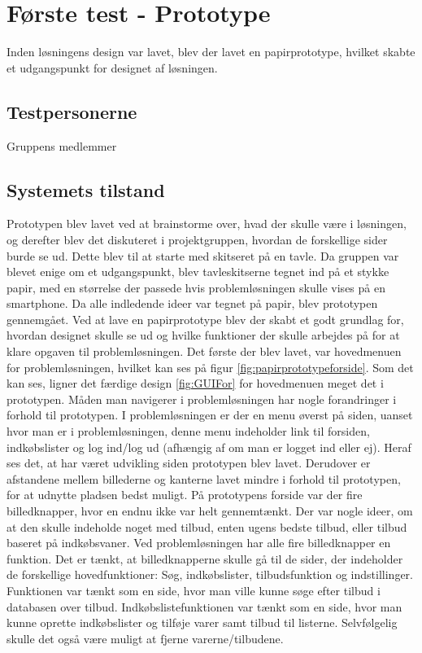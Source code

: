 \section{Første test - Prototype}
Inden løsningens design var lavet, blev der lavet en papirprototype, hvilket skabte et udgangspunkt for designet af løsningen.


\subsection{Testpersonerne}
Gruppens medlemmer

\subsection{Systemets tilstand}
Prototypen blev lavet ved at brainstorme over, hvad der skulle være i løsningen, og derefter blev det diskuteret i projektgruppen, hvordan de forskellige sider burde se ud. Dette blev til at starte med skitseret på en tavle. Da gruppen var blevet enige om et udgangspunkt, blev tavleskitserne tegnet ind på et stykke papir, med en størrelse der passede hvis problemløsningen skulle vises på en smartphone. Da alle indledende ideer var tegnet på papir, blev prototypen gennemgået. Ved at lave en papirprototype blev der skabt et godt grundlag for, hvordan designet skulle se ud og hvilke funktioner der skulle arbejdes på for at klare opgaven til problemløsningen.
Det første der blev lavet, var hovedmenuen for problemløsningen, hvilket kan ses på figur \ref{fig:papirprototypeforside}. Som det kan ses, ligner det færdige design \ref{fig:GUIFor} for hovedmenuen meget det i prototypen. Måden man navigerer i problemløsningen har nogle forandringer i forhold til prototypen. I problemløsningen er der en menu øverst på siden, uanset hvor man er i problemløsningen, denne menu indeholder link til forsiden, indkøbslister og log ind/log ud (afhængig af om man er logget ind eller ej). Heraf ses det, at har været udvikling siden prototypen blev lavet. Derudover er afstandene mellem billederne og kanterne lavet mindre i forhold til prototypen, for at udnytte pladsen bedst muligt.
På prototypens forside var der fire billedknapper, hvor en endnu ikke var helt gennemtænkt. Der var nogle ideer, om at den skulle indeholde noget med tilbud, enten ugens bedste tilbud, eller tilbud baseret på indkøbsvaner. Ved problemløsningen har alle fire billedknapper en funktion. Det er tænkt, at billedknapperne skulle gå til de sider, der indeholder de forskellige hovedfunktioner: Søg, indkøbslister, tilbudsfunktion og indstillinger. Funktionen  var tænkt som en side, hvor man ville kunne søge efter tilbud i databasen over tilbud. Indkøbslistefunktionen var tænkt som en side, hvor man kunne oprette indkøbslister og tilføje varer samt tilbud til listerne. Selvfølgelig skulle det også være muligt at fjerne varerne/tilbudene.
